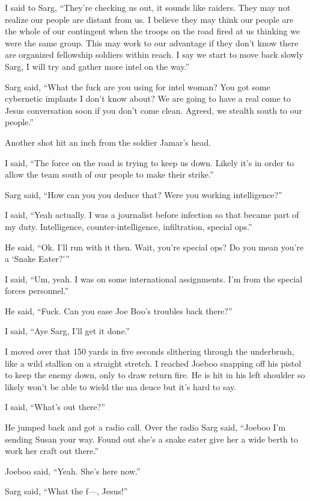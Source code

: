 I said to Sarg, ``They're checking us out, it sounds like raiders. They may not realize our people are distant from us. I believe they may think our people are the whole of our contingent when the troops on the road fired at us thinking we were the same group. This may work to our advantage if they don't know there are organized fellowship soldiers within reach. I say we start to move back slowly Sarg, I will try and gather more intel on the way.''

Sarg said, ``What the fuck are you using for intel woman? You got some cybernetic implants I don't know about? We are going to have a real come to Jesus conversation soon if you don't come clean. Agreed, we stealth south to our people.''

Another shot hit an inch from the soldier Jamar's head. 

I said, ``The force on the road is trying to keep us down. Likely it's in order to allow the team south of our people to make their strike.''

Sarg said, ``How can you you deduce that? Were you working intelligence?''

I said, ``Yeah actually. I was a journalist before infection so that became part of my duty. Intelligence, counter-intelligence, infiltration, special ops.''

He said, ``Ok. I'll run with it then. Wait, you're special ops? Do you mean you're a `Snake Eater?'''

I said, ``Um, yeah. I was on some international assignments.  I'm from the special forces personnel.''

He said, ``Fuck. Can you ease Joe Boo's troubles back there?''

I said, ``Aye Sarg, I'll get it done.''

I moved over that 150 yards in five seconds slithering through the underbrush, like a wild stallion on a straight stretch. I reached Joeboo snapping off his pistol to keep the enemy down, only to draw return fire. He is hit in his left shoulder so likely won't be able to wield the ma deuce but it's hard to say.

I said, ``What's out there?''

He jumped back and got a radio call. Over the radio Sarg said, ``Joeboo I'm sending Susan your way. Found out she's a snake eater give her a wide berth to work her craft out there.''

Joeboo said, ``Yeah. She's here now.''

Sarg said, ``What the f---, Jesus!''

